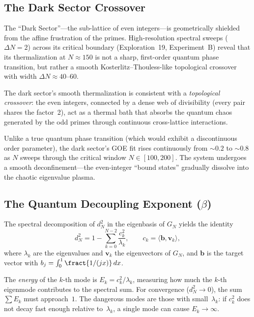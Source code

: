 \subsection{The Dark Sector Crossover}
\label{sec:dark-sector}

The ``Dark Sector''---the sub-lattice of even integers---is geometrically
shielded from the affine frustration of the primes. High-resolution
spectral sweeps ($\Delta N = 2$) across its critical boundary (Exploration~19,
Experiment~B) reveal that its thermalization at $N \approx 150$ is not a
sharp, first-order quantum phase transition, but rather a smooth
Kosterlitz--Thouless-like topological crossover with width
$\Delta N \approx 40$--$60$.

\begin{principle}
The dark sector's smooth thermalization is consistent with a
\emph{topological crossover}: the even integers, connected by a dense
web of divisibility (every pair shares the factor~2), act as a thermal
bath that absorbs the quantum chaos generated by the odd primes through
continuous cross-lattice interactions.

Unlike a true quantum phase transition (which would exhibit a
discontinuous order parameter), the dark sector's GOE fit rises
continuously from $\sim 0.2$ to $\sim 0.8$ as $N$ sweeps through the
critical window $N \in [100, 200]$. The system undergoes a smooth
deconfinement---the even-integer ``bound states'' gradually dissolve
into the chaotic eigenvalue plasma.
\end{principle}

\subsection{The Quantum Decoupling Exponent ($\beta$)}
\label{sec:decoupling}

The spectral decomposition of $d_N^2$ in the eigenbasis of $G_N$
yields the identity
\[
  d_N^2 = 1 - \sum_{k=0}^{N-2} \frac{c_k^2}{\lambda_k},
  \qquad c_k = \langle \mathbf{b}, \mathbf{v}_k \rangle,
\]
where $\lambda_k$ are the eigenvalues and $\mathbf{v}_k$ the eigenvectors
of $G_N$, and $\mathbf{b}$ is the target vector with
$b_j = \int_0^1 \fract{1/(jx)}\,dx$.

The \emph{energy} of the $k$-th mode is $E_k = c_k^2/\lambda_k$,
measuring how much the $k$-th eigenmode contributes to the spectral sum.
For convergence ($d_N^2 \to 0$), the sum $\sum E_k$ must approach~$1$.
The dangerous modes are those with small~$\lambda_k$: if $c_k^2$ does
not decay fast enough relative to~$\lambda_k$, a single mode can cause
$E_k \to \infty$.

